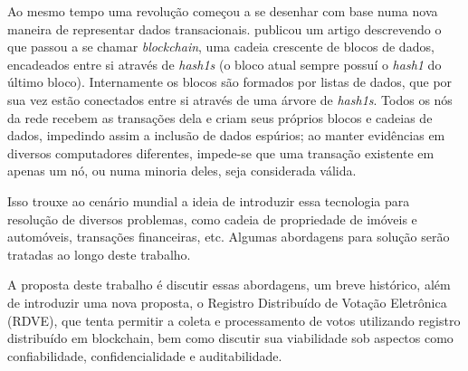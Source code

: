Ao mesmo tempo uma revolução começou a se desenhar com base numa nova maneira de representar dados transacionais.  publicou um artigo descrevendo o que passou a se chamar \textit{blockchain}, uma cadeia crescente de blocos de dados, encadeados entre si através de \textit{\glspl{hash1}} (o bloco atual sempre possuí o \textit{\gls{hash1}} do último bloco). Internamente os blocos são formados por listas de dados, que por sua vez estão conectados entre si através de uma árvore de \textit{\glspl{hash1}}. Todos os nós da rede recebem as transações dela e criam seus próprios blocos e cadeias de dados, impedindo assim a inclusão de dados espúrios; ao manter evidências em diversos computadores diferentes, impede-se que uma transação existente em apenas um nó, ou numa minoria deles, seja considerada válida. 

Isso trouxe ao cenário mundial a ideia de introduzir essa tecnologia para resolução de diversos problemas, como cadeia de propriedade de imóveis e automóveis, transações financeiras, etc. Algumas abordagens para solução serão tratadas ao longo deste trabalho.  

A proposta deste trabalho é discutir essas abordagens, um breve histórico, além de introduzir uma nova proposta, o Registro Distribuído de Votação Eletrônica (RDVE), que tenta permitir a coleta e processamento de votos utilizando registro distribuído em blockchain, bem como discutir sua viabilidade sob aspectos como confiabilidade, confidencialidade e auditabilidade. 